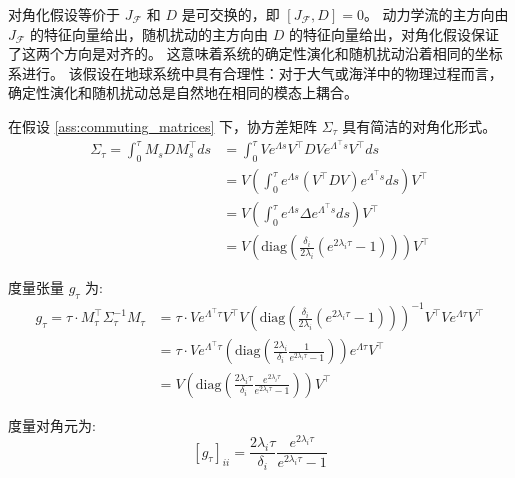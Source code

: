 \documentclass[12pt, a4paper]{article}
\newcommand{\metric}{g}
\newcommand{\drift}{\mathcal{F}}  %
\newcommand{\difftensor}{D}       %
\newcommand{\jacobian}{J}         %
\newcommand{\fundsol}{M}          %
\newcommand{\predtime}{\tau}      %
\newcommand{\covmat}{\Sigma}        %
\newcommand{\eigenval}{\lambda}         %
\newcommand{\eigenvalmat}{\Lambda}      %
\newcommand{\diffeigenvalmat}{\Delta}   %
\newcommand{\eigenvecmat}{V}            %
\begin{document}
对角化假设等价于 $\jacobian_{\drift}$ 和 $\difftensor$ 是可交换的，即 $[\jacobian_{\drift}, \difftensor] = 0$。
动力学流的主方向由 $\jacobian_{\drift}$ 的特征向量给出，随机扰动的主方向由 $\difftensor$ 的特征向量给出，对角化假设保证了这两个方向是对齐的。
这意味着系统的确定性演化和随机扰动沿着相同的坐标系进行。
该假设在地球系统中具有合理性：对于大气或海洋中的物理过程而言，确定性演化和随机扰动总是自然地在相同的模态上耦合。

在假设 \ref{ass:commuting_matrices} 下，协方差矩阵 $\covmat_{\predtime}$ 具有简洁的对角化形式。
\begin{align*}
    \covmat_{\predtime} = \int_0^{\predtime} \fundsol_s \difftensor \fundsol_s^\top ds &= \int_0^{\predtime} \eigenvecmat e^{\eigenvalmat s} \eigenvecmat^\top \difftensor \eigenvecmat e^{\eigenvalmat^\top s} \eigenvecmat^\top ds \\
    &= \eigenvecmat \left(\int_0^{\predtime} e^{\eigenvalmat s} (\eigenvecmat^\top \difftensor \eigenvecmat) e^{\eigenvalmat^\top s} ds\right) \eigenvecmat^\top \\
    &= \eigenvecmat \left(\int_0^{\predtime} e^{\eigenvalmat s} \diffeigenvalmat e^{\eigenvalmat^\top s} ds\right) \eigenvecmat^\top \\
    &= \eigenvecmat \left(\text{diag}(\frac{\delta_i}{2 \eigenval_i} (e^{2 \eigenval_i \predtime} - 1))\right) \eigenvecmat^\top
\end{align*}

度量张量 $\metric_{\predtime}$ 为:
\begin{align*}
    \metric_{\predtime} = \predtime \cdot \fundsol_{\predtime}^\top \covmat_{\predtime}^{-1} \fundsol_{\predtime} &= \predtime \cdot \eigenvecmat e^{\eigenvalmat^\top \predtime} \eigenvecmat^\top \eigenvecmat \left(\text{diag}(\frac{\delta_i}{2 \eigenval_i} (e^{2 \eigenval_i \predtime} - 1))\right)^{-1} \eigenvecmat^\top \eigenvecmat e^{\eigenvalmat \predtime} \eigenvecmat^\top \\
    &= \predtime \cdot \eigenvecmat e^{\eigenvalmat^\top \predtime} \left(\text{diag}(\frac{2 \eigenval_i}{\delta_i} \frac{1}{e^{2\eigenval_i \predtime} - 1})\right) e^{\eigenvalmat \predtime} \eigenvecmat^\top \\
    &= \eigenvecmat \left(\text{diag}\left(\frac{2 \eigenval_i \predtime}{\delta_i} \frac{e^{2\eigenval_i \predtime}}{e^{2\eigenval_i \predtime} - 1}\right)\right) \eigenvecmat^\top
\end{align*}

度量对角元为:
\begin{equation}
\label{eq:metric_tensor_diagonal_element}
    [\metric_{\predtime}]_{ii} = \frac{2\eigenval_i \predtime}{\delta_i} \frac{e^{2\eigenval_i\predtime}}{e^{2\eigenval_i\predtime} - 1}
\end{equation}
\end{document}

